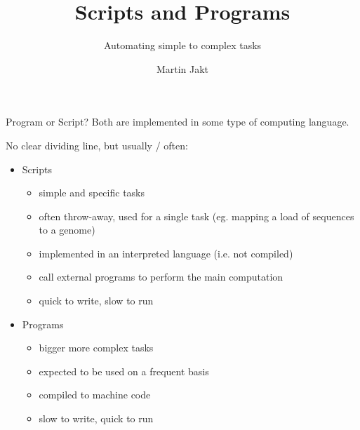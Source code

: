 \documentclass[pdf]{beamer}
\title{Scripts and Programs}
\subtitle{Automating simple to complex tasks}
\author{Martin Jakt}
\begin{document}
\begin{frame}
  \titlepage
\end{frame}

\begin{frame}{Program or Script?}
  Both are implemented in some type of computing language.

  No clear dividing line, but usually / often:
  \begin{itemize}
    \item{Scripts}
      \begin{itemize}
      \item simple and specific tasks
      \item often throw-away, used for a single task (eg. mapping a load of
        sequences to a genome)
      \item implemented in an interpreted language (i.e. not compiled)
      \item call external programs to perform the main computation
      \item quick to write, slow to run
      \end{itemize}
  \end{itemize}
  
  \begin{itemize}
    \item{Programs}
      \begin{itemize}
      \item bigger more complex tasks
      \item expected to be used on a frequent basis
      \item compiled to machine code
      \item slow to write, quick to run
      \end{itemize}
  \end{itemize}
  
\end{frame}
\end{document}
